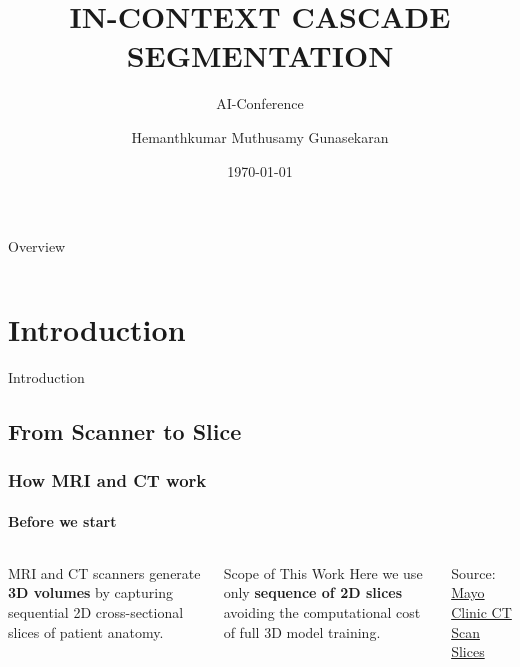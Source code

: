 \documentclass[nometaot,lecture,amberg,toc=twocolumn,indicatelastpageofframe,footlinebox]{OTHAWbeamer}
\title{IN-CONTEXT CASCADE SEGMENTATION}
\subtitle{AI-Conference}
\author{Hemanthkumar Muthusamy Gunasekaran}
\date{\today}
\begin{document}

\maketitle
{}

\begin{frame}{Overview}
    \begin{columns}[t]
            \tableofcontents[sections={1-3},hideallsubsections]
            \tableofcontents[sections={4-6},hideallsubsections]
    \end{columns}
\end{frame}

\section{Introduction}
\begin{breakframe}
    Introduction
\end{breakframe}

\subsection{From Scanner to Slice}
\begin{frame}
    \frametitle{How MRI and CT work}
    \framesubtitle{Before we start}

    \begin{columns}[t]

            MRI and CT scanners generate \textcolor{orange1}{\textbf{3D volumes}}
            by capturing sequential 2D cross-sectional slices of patient anatomy.

            \vspace{0.6em}

            \vspace{0.6em}

            \begin{block}{Scope of This Work}
                Here we use only \textbf{sequence of 2D slices}
                avoiding the computational cost of full 3D model training.
            \end{block}

            \vspace{0pt}
            \centering
            

            \vspace{0.3em}
            {\tiny\textcolor{grau2}{Source: \href{https://www.mayoclinic.org/tests-procedures/ct-scan/multimedia/ct-scan-slices/img-20008348}{Mayo Clinic CT Scan Slices}}}

    \end{columns}

\end{frame}
\end{document}
